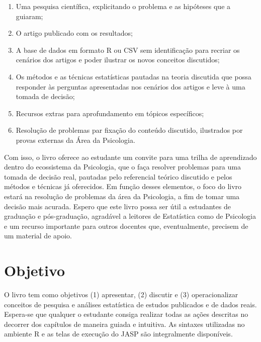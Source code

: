 \documentclass[
]{book}
\providecommand{\tightlist}{%
  \setlength{\itemsep}{0pt}\setlength{\parskip}{0pt}}
\begin{document}
\begin{enumerate}
\def\labelenumi{\arabic{enumi}.}
\tightlist
\item
  Uma pesquisa científica, explicitando o problema e as hipóteses que a guiaram;\\
\item
  O artigo publicado com os resultados;\\
\item
  A base de dados em formato R ou CSV sem identificação para recriar os cenários dos artigos e poder ilustrar os novos conceitos discutidos;\\
\item
  Os métodos e as técnicas estatísticas pautadas na teoria discutida que possa responder às perguntas apresentadas nos cenários dos artigos e leve à uma tomada de decisão;\\
\item
  Recursos extras para aprofundamento em tópicos específicos;\\
\item
  Resolução de problemas par fixação do conteúdo discutido, ilustrados por provas externas da Área da Psicologia.
\end{enumerate}

Com isso, o livro oferece ao estudante um convite para uma trilha de aprendizado dentro do ecossistema da Psicologia, que o faça resolver problemas para uma tomada de decisão real, pautadas pelo referencial teórico discutido e pelos métodos e técnicas já oferecidos. Em função desses elementos, o foco do livro estará na resolução de problemas da área da Psicologia, a fim de tomar uma decisão mais acurada.
Espero que este livro possa ser útil a estudantes de graduação e pós-graduação, agradável a leitores de Estatística como de Psicologia e um recurso importante para outros docentes que, eventualmente, precisem de um material de apoio.

\hypertarget{objetivo}{%
\section{Objetivo}\label{objetivo}}

O livro tem como objetivos (1) apresentar, (2) discutir e (3) operacionalizar conceitos de pesquisa e análises estatística de estudos publicados e de dados reais. Espera-se que qualquer o estudante consiga realizar todas as ações descritas no decorrer dos capítulos de maneira guiada e intuitiva. As sintaxes utilizadas no ambiente R e as telas de execução do JASP são integralmente disponíveis.
\end{document}
